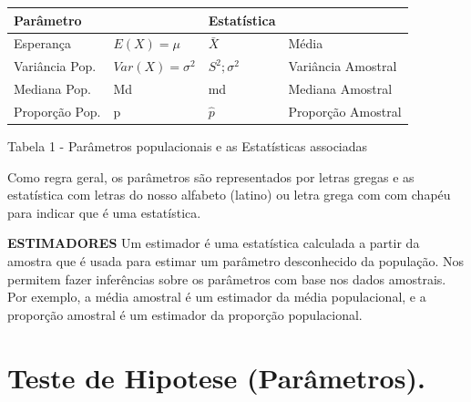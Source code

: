 \documentclass[
  letterpaper,
  DIV=11,
  numbers=noendperiod]{scrreprt}
\begin{document}
\begin{longtable}[]{@{}
  >{\raggedright\arraybackslash}p{}
  >{\raggedright\arraybackslash}p{}
  >{\raggedright\arraybackslash}p{}
  >{\raggedright\arraybackslash}p{}@{}}
\toprule\noalign{}
\begin{minipage}[b]{\linewidth}\raggedright
Parâmetro
\end{minipage} & \begin{minipage}[b]{\linewidth}\raggedright
\end{minipage} & \begin{minipage}[b]{\linewidth}\raggedright
Estatística
\end{minipage} & \begin{minipage}[b]{\linewidth}\raggedright
\end{minipage} \\
\midrule\noalign{}
\endhead
\bottomrule\noalign{}
\endlastfoot
Esperança & \(E(X)=\mu\) & \(\bar{X}\) & Média \\
Variância Pop. & \(Var(X)=\sigma^2\) & \(S^2;\sigma^2\) & Variância
Amostral \\
Mediana Pop. & Md & md & Mediana Amostral \\
Proporção Pop. & p & \(\hat{p}\) & Proporção Amostral \\
\end{longtable}

{Tabela 1 - Parâmetros populacionais e as Estatísticas associadas}

Como regra geral, os parâmetros são representados por letras gregas e as
estatística com letras do nosso alfabeto (latino) ou letra grega com com
chapéu para indicar que é uma estatística.

\textbf{ESTIMADORES} Um estimador é uma estatística calculada a partir
da amostra que é usada para estimar um parâmetro desconhecido da
população. Nos permitem fazer inferências sobre os parâmetros com base
nos dados amostrais. Por exemplo, a média amostral é um estimador da
média populacional, e a proporção amostral é um estimador da proporção
populacional.

\section{Teste de Hipotese
(Parâmetros).}\label{teste-de-hipotese-paruxe2metros.}
\end{document}
